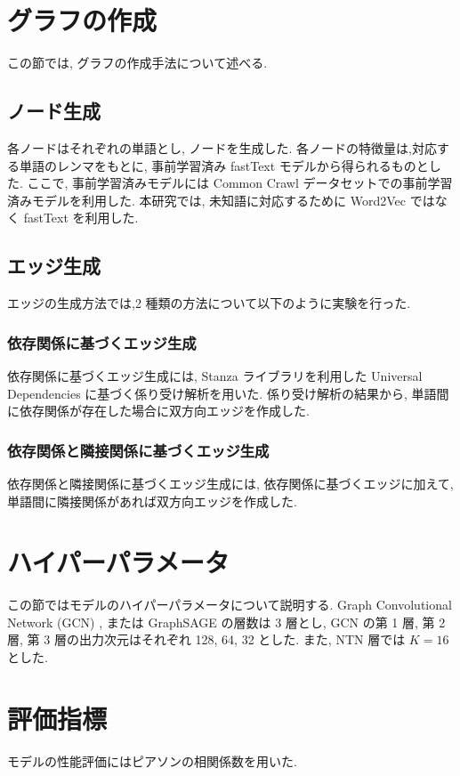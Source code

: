 \documentclass[a4j,twoside,12pt]{thesis} %
\begin{document}
\section{グラフの作成}
この節では, グラフの作成手法について述べる.

\subsection{ノード生成}
各ノードはそれぞれの単語とし, ノードを生成した.
各ノードの特徴量は,対応する単語のレンマをもとに, 事前学習済み fastText\cite{bojanowski2017enriching} モデルから得られるものとした.
ここで, 事前学習済みモデルには Common Crawl データセットでの事前学習済みモデルを利用した.
本研究では, 未知語に対応するために Word2Vec ではなく fastText を利用した.

\subsection{エッジ生成}
エッジの生成方法では,2 種類の方法について以下のように実験を行った.
\subsubsection{依存関係に基づくエッジ生成}
依存関係に基づくエッジ生成には, Stanza\cite{qi2020stanza} ライブラリを利用した Universal Dependencies に基づく係り受け解析を用いた.
係り受け解析の結果から, 単語間に依存関係が存在した場合に双方向エッジを作成した.

\subsubsection{依存関係と隣接関係に基づくエッジ生成}
依存関係と隣接関係に基づくエッジ生成には, 依存関係に基づくエッジに加えて, 単語間に隣接関係があれば双方向エッジを作成した.

\section{ハイパーパラメータ}
この節ではモデルのハイパーパラメータについて説明する.
Graph Convolutional Network (GCN) \cite{kipf2017semi} , または GraphSAGE \cite{hamilton2017inductive} の層数は 3 層とし, GCN の第 1 層, 第 2 層, 第 3 層の出力次元はそれぞれ 128, 64, 32 とした. また, NTN 層では $K=16$ とした.

\section{評価指標}
モデルの性能評価にはピアソンの相関係数を用いた.
\end{document}
